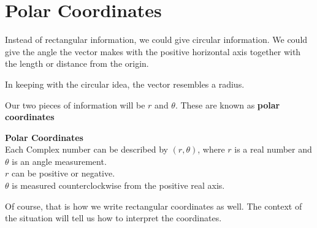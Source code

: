 \documentclass{ximera}
\begin{document}
\section*{Polar Coordinates}

Instead of rectangular information, we could give circular information.  We could give the angle the vector makes with the positive horizontal axis together with the length or distance from the origin. 

In keeping with the circular idea, the vector resembles a radius.  

Our two pieces of information will be $r$ and $\theta$. These are known as \textbf{polar coordinates}




\begin{definition}   \textbf{\textcolor{green!50!black}{Polar Coordinates}} \\

Each Complex number can be described by $(r, \theta)$, where $r$ is a real number and $\theta$ is an angle measurement.  \\


$r$ can be positive or negative. \\
$\theta$ is measured counterclockwise from the positive real axis. \\

\end{definition}


Of course, that is how we write rectangular coordinates as well.  The context of the situation will tell us how to interpret the coordinates.
\end{document}
